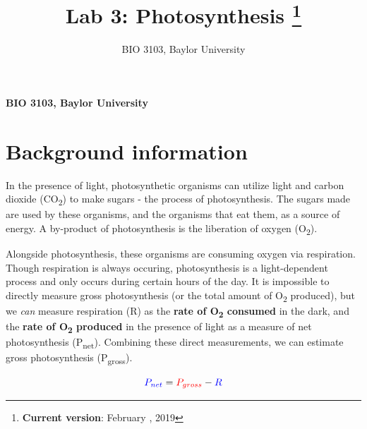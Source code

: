 \documentclass[11pt,]{article}
\title{Lab 3: Photosynthesis \thanks{\textbf{Current version}: February , 2019}  }
\author{\Large BIO 3103, Baylor University\vspace{0.05in} \newline\normalsize\emph{}  }
\date{}
\newcommand*{\authorfont}{\fontfamily{phv}\selectfont}
\begin{document}
	
%



{%
\setlength{\parindent}{0pt}
\thispagestyle{plain}
{\fontsize{18}{20}\selectfont\raggedright 
\maketitle  %

}

{
   \vskip 13.5pt\relax \normalsize\fontsize{11}{12} 
\textbf{\authorfont BIO 3103, Baylor University} \hskip 15pt \emph{\small }   

}

}




\noindent  \section{Background information}\label{background-information}

\newcommand{\textunderscript}[1]{$_{\text{#1}}$}

In the presence of light, photosynthetic organisms can utilize light and
carbon dioxide (CO\textsubscript{2}) to make sugars - the process of
photosynthesis. The sugars made are used by these organisms, and the
organisms that eat them, as a source of energy. A by-product of
photosynthesis is the liberation of oxygen (O\textsubscript{2}).

Alongside photosynthesis, these organisms are consuming oxygen via
respiration. Though respiration is always occuring, photosynthesis is a
light-dependent process and only occurs during certain hours of the day.
It is impossible to directly measure gross photosynthesis (or the total
amount of O\textsubscript{2} produced), but we \emph{can} measure
respiration (R) as the \textbf{rate of O\textsubscript{2} consumed} in
the dark, and the \textbf{rate of O\textsubscript{2} produced} in the
presence of light as a measure of net photosynthesis
(P\textsubscript{net}). Combining these direct measurements, we can
estimate gross photosynthesis (P\textsubscript{gross}).

\begin{equation}
\color{blue} P_{net} \color{black}= \color{red}P_{gross} \color{black}- \color{blue}R
\end{equation}
\end{document}
